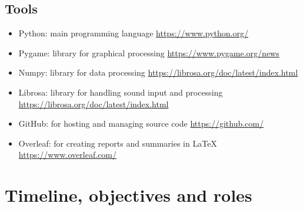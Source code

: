 \documentclass{article}
\begin{document}
\subsection{Tools}
\begin{itemize}
    \item Python: main programming language \url{https://www.python.org/}
    \item Pygame: library for graphical processing \url{https://www.pygame.org/news}
    \item Numpy: library for data processing \url{https://librosa.org/doc/latest/index.html}
    \item Librosa: library for handling sound input and processing \url{https://librosa.org/doc/latest/index.html}
    \item GitHub: for hosting and managing source code \url{https://github.com/}
    \item Overleaf: for creating reports and summaries in LaTeX \url{https://www.overleaf.com/}
\end{itemize}


\section{Timeline, objectives and roles}

\end{document}
